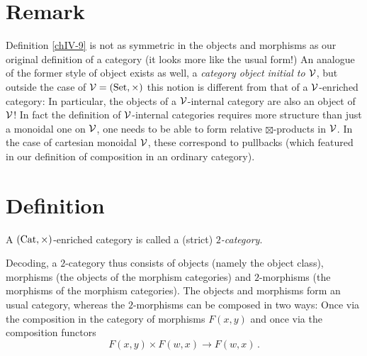     \section{Remark}
        Definition \ref{chIV-9} is not as symmetric in the objects and morphisms as our original definition of a category (it looks more like the usual form!) An analogue of the former style of object exists as well, a \emph{category object initial to $\mathcal{V}$}, but outside the case of $\mathcal{V} = (\operatorname{Set}, \times)$ this notion is different from that of a $\mathcal{V}$-enriched category: In particular, the objects of a $\mathcal{V}$-internal category are also an object of $\mathcal{V}$! In fact the definition of $\mathcal{V}$-internal categories requires more structure than just a monoidal one on $\mathcal{V}$, one needs to be able to form relative $\boxtimes$-products in $\mathcal{V}$. In the case of cartesian monoidal $\mathcal{V}$, these correspond to pullbacks (which featured in our definition of composition in an ordinary category).

    \section{Definition}
        A $(\operatorname{Cat}, \times)$-enriched category is called a (strict) \emph{$2$-category}.
        \smallskip

        Decoding, a $2$-category thus consists of objects (namely the object class), morphisms (the objects of the morphism categories) and $2$-morphisms (the morphisms of the morphism categories). The objects and morphisms form an usual category, whereas the $2$-morphisms can be composed in two ways: Once via the composition in the category of morphisms $F(x, y)$ and once via the composition functors
        \begin{equation*}
            F(x, y) \times F(w, x) \to F(w, x) \,.
        \end{equation*}

